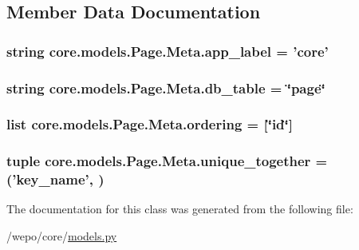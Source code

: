 \subsection{Member Data Documentation}
\hypertarget{classcore_1_1models_1_1Page_1_1Meta_a57b04d150a5126b25b5fa9f2ba2c445f}{
\subsubsection[{app\-\_\-label}]{\setlength{\rightskip}{0pt plus 5cm}string core.\-models.\-Page.\-Meta.\-app\-\_\-label = 'core'\hspace{0.3cm}{\ttfamily [static]}}}\label{classcore_1_1models_1_1Page_1_1Meta_a57b04d150a5126b25b5fa9f2ba2c445f}
\hypertarget{classcore_1_1models_1_1Page_1_1Meta_a6fa4bdea4de38b6d5022ac631e951815}{
\subsubsection[{db\-\_\-table}]{\setlength{\rightskip}{0pt plus 5cm}string core.\-models.\-Page.\-Meta.\-db\-\_\-table = \char`\"{}page\char`\"{}\hspace{0.3cm}{\ttfamily [static]}}}\label{classcore_1_1models_1_1Page_1_1Meta_a6fa4bdea4de38b6d5022ac631e951815}
\hypertarget{classcore_1_1models_1_1Page_1_1Meta_a6fc6e8d5355ce27608378e7c32732cb9}{
\subsubsection[{ordering}]{\setlength{\rightskip}{0pt plus 5cm}list core.\-models.\-Page.\-Meta.\-ordering = \mbox{[}\char`\"{}id\char`\"{}\mbox{]}\hspace{0.3cm}{\ttfamily [static]}}}\label{classcore_1_1models_1_1Page_1_1Meta_a6fc6e8d5355ce27608378e7c32732cb9}
\hypertarget{classcore_1_1models_1_1Page_1_1Meta_a2cbe9a4733715f0d91d839d47fab5f28}{
\subsubsection[{unique\-\_\-together}]{\setlength{\rightskip}{0pt plus 5cm}tuple core.\-models.\-Page.\-Meta.\-unique\-\_\-together = ('{\bf key\-\_\-name}', )\hspace{0.3cm}{\ttfamily [static]}}}\label{classcore_1_1models_1_1Page_1_1Meta_a2cbe9a4733715f0d91d839d47fab5f28}


The documentation for this class was generated from the following file\-:\begin{DoxyCompactItemize}
\item 
/wepo/core/\hyperlink{models_8py}{models.\-py}\end{DoxyCompactItemize}
